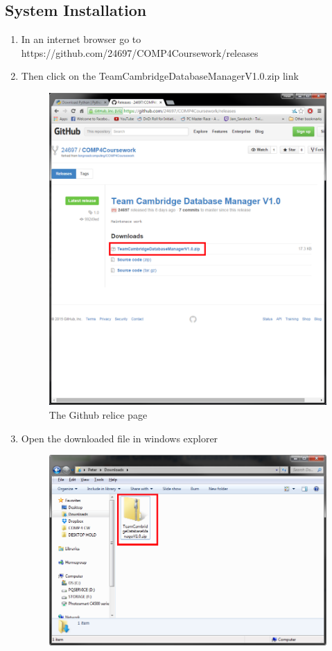 \subsection{System Installation}
\begin{enumerate}
\item In an internet browser go to https://github.com/24697/COMP4Coursework/releases
\item Then click on the TeamCambridgeDatabaseManagerV1.0.zip link
\begin{figure}[H]
\includegraphics[width=\textwidth]{./Manual/SystemInstall/Part1.png}
\caption{The Github relice page} \label{fig:SyIsP1}
\end{figure}
\item Open the downloaded file in windows explorer
\begin{figure}[H]
\includegraphics[width=\textwidth]{./Manual/SystemInstall/Part2.png}

\end{figure}
\end{enumerate}
